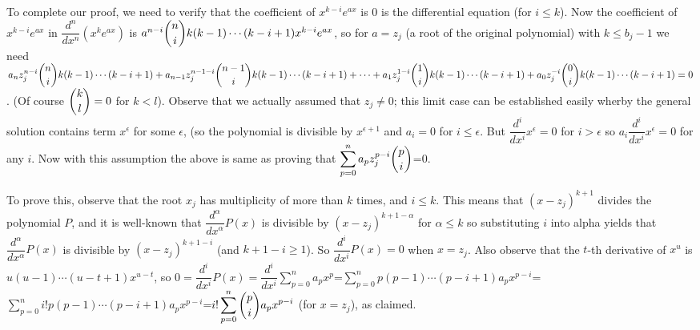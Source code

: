 \documentclass[11pt,a4paper]{article}
\begin{document}
\begin {enumerate}
To complete our proof, we need to verify that the coefficient of $x^{k-i}e^{ax}$ is 0 is the differential equation (for $i\le k$). Now the coefficient of $x^{k-i}e^{ax}$ in $\dfrac{d^{n}}{dx^{n}}(x^{k}e^{ax})$ is $a^{n-i}\dbinom{n}{i} k(k-1)\cdots (k-i+1) x^{k-i}e^{ax}$, so for $a=z_j$ (a root of the original polynomial) with $k\le b_j-1$ we need $a_{n}z_{j}^{n-i}\dbinom{n}{i} k(k-1)\cdots (k-i+1)+a_{n-1}z_{j}^{n-1-i}\dbinom{n-1}{i} k(k-1)\cdots (k-i+1)+\cdots +a_1z_{j}^{1-i}\dbinom{1}{i} k(k-1)\cdots (k-i+1)+a_0z_{j}^{-i}\dbinom{0}{i} k(k-1)\cdots (k-i+1)=0$. (Of course $\dbinom{k}{l}=0$ for $k<l$). Observe that we actually assumed that $z_j\ne 0$; this limit case can be established easily wherby the general solution contains term $x^{\epsilon}$ for some $\epsilon$, (so the polynomial is divisible by $x^{\epsilon+1}$ and $a_i=0$ for $i\le\epsilon$. But $\dfrac{d^i}{dx^i}x^{\epsilon}=0$ for $i>\epsilon$ so $a_i\dfrac{d^i}{dx^i}x^{\epsilon}=0$ for any $i$. Now with this assumption the above is same as proving that $\displaystyle\sum_{p=0}^{n} a_pz_j^{p-i}\dbinom{p}{i}$=0.

To prove this, observe that the root $x_j$ has multiplicity of more than $k$ times, and $i\le k$. This means that $(x-z_j)^{k+1}$ divides the polynomial $P$, and it is well-known that $\dfrac{d^{\alpha}}{dx^{\alpha}}P(x)$ is divisible by $(x-z_j)^{k+1-\alpha}$ for $\alpha\le k$ so substituting $i$ into alpha yields that $\dfrac{d^{\alpha}}{dx^{\alpha}}P(x)$ is divisible by $(x-z_j)^{k+1-i}$ (and $k+1-i\ge 1$). So $\dfrac{d^{i}}{dx^{i}}P(x)=0$ when $x=z_j$. Also observe that the $t$-th derivative of $x^u$ is $u(u-1)\cdots (u-t+1)x^{u-t}$, so $0=\dfrac{d^{i}}{dx^{i}}P(x)=\dfrac{d^{i}}{dx^{i}}\displaystyle\sum_{p=0}^{n} a_px^p$=$\displaystyle\sum_{p=0}^{n}p(p-1)\cdots (p-i+1) a_px^{p-i}$=$\displaystyle\sum_{p=0}^{n}i!p(p-1)\cdots (p-i+1) a_px^{p-i}$=$i!\displaystyle\sum_{p=0}^{n}\dbinom{p}{i} a_px^{p-i}$ (for $x=z_j$), as claimed.
\end{enumerate}
\end{document}

